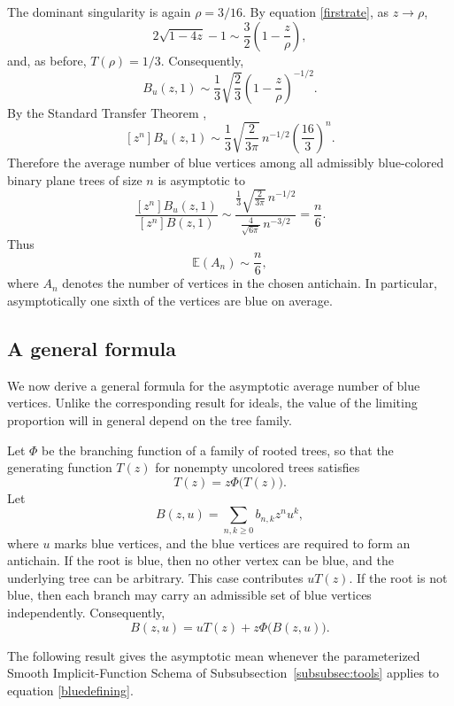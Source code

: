 \documentclass[11pt, onesided]{amsart}
\theoremstyle{remark}
\begin{document}
The dominant singularity is again $\rho=3/16$.
By equation \eqref{firstrate}, as $z\to\rho$,
\[
2\sqrt{1-4z}-1
\sim
\frac32\left(1-\frac{z}{\rho}\right),
\]
and, as before,
$T(\rho)=1/3$.
Consequently,
\[
B_u(z,1)
\sim
\frac13\sqrt{\frac23}
\left(1-\frac{z}{\rho}\right)^{-1/2}.
\]
By the Standard Transfer Theorem \cite[Corollary VI.1]{FlajoletSedgewick},
\[
[z^n]B_u(z,1)
\sim
\frac13\sqrt{\frac{2}{3\pi}}\,
 n^{-1/2}\left(\frac{16}{3}\right)^n.
\]
Therefore the average number of blue vertices among all admissibly blue-colored binary plane trees of size $n$ is asymptotic to
\[
\frac{[z^n]B_u(z,1)}{[z^n]B(z,1)}
\sim
\frac{
\frac13\sqrt{\frac{2}{3\pi}}\,n^{-1/2}
}{
\frac{4}{\sqrt{6\pi}}\,n^{-3/2}
}
=
\frac{n}{6}.
\]
Thus
\[
{
\mathbb E(A_n)\sim \frac{n}{6},
}
\]
where $A_n$ denotes the number of vertices in the chosen antichain.  In particular, asymptotically one sixth of the vertices are blue on average.



\subsection{A general formula}

We now derive a general formula for the asymptotic average number of blue
vertices. Unlike the corresponding result for ideals, the value of the
limiting proportion will in general depend on the tree family.

Let $\Phi$ be the branching function of a family of rooted trees, so that
the generating function $T(z)$ for nonempty uncolored trees satisfies
\begin{equation}\label{blueT}
T(z)=z\Phi\big(T(z)\big).
\end{equation}
Let
\[
B(z,u)=\sum_{n,k\geq 0} b_{n,k}z^n u^k,
\]
where $u$ marks blue vertices, and the blue vertices are required to form an
antichain.  If the root is blue, then no other vertex can be blue, and the
underlying tree can be arbitrary.  This case contributes $uT(z)$.  If the
root is not blue, then each branch may carry an admissible set of blue
vertices independently.  Consequently,
\begin{equation}\label{bluedefining}
B(z,u)=uT(z)+z\Phi\big(B(z,u)\big).
\end{equation}

The following result gives the asymptotic mean whenever the parameterized
Smooth Implicit-Function Schema of Subsubsection~\ref{subsubsec:tools}
applies to equation \eqref{bluedefining}.
\end{document}
